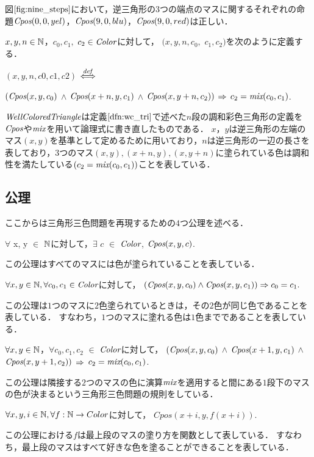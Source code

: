 \begin{exm}
  図$\ref{fig:nine_steps}$において，逆三角形の$3$つの端点のマスに関するそれぞれの命題$\textit{Cpos}(0,0,yel)$，$\textit{Cpos}(9,0,blu)$，$\textit{Cpos}(9,0,red)$は正しい．
\end{exm}
\begin{dfn}[$\WCT$]
  $x, y, n \in \mathbb{N}$，$c_0, c_1,$ $c_2 \in \textit{Color}$に対して，
  \WCT$(x, y, n, c_0,$ $c_1, c_2)$を次のように定義する．
  
  \WCT$(x, y, n, c0, c1, c2)$ $\overset{{\it def}}{\Longleftrightarrow}$
  
  $(\textit{Cpos}(x,y,c_0)$ $\land$ $\textit{Cpos}(x+n,y,c_1)$ $\land$ $\textit{Cpos}(x,y+n,c_2))$ $\Rightarrow$ $c_2 = \textit{mix}(c_0,c_1)$.
  
  $\WCT$は定義$\ref{dfn:wc_tri}$で述べた$n$段の調和彩色三角形の定義を$\textit{Cpos}$や$\textit{mix}$を用いて論理式に書き直したものである．
  $x$，$y$は逆三角形の左端のマス$(x,y)$を基準として定めるために用いており，$n$は逆三角形の一辺の長さを表しており，$3$つのマス$(x,y), (x+n,y), (x,y+n)$に塗られている色は調和性を満たしている$(c_2=\textit{mix}(c_0,c_1))$ことを表している．
\end{dfn}

\subsection{公理}
ここからは三角形三色問題を再現するための$4$つ公理を述べる．
\begin{axm}[$\Cexists$] \label{axm:exists}
  $\forall$ x, y $\in$ $\mathbb{N}$に対して，$\exists$ $c$ $\in$ $\textit{Color}$, $\textit{Cpos}(x,y,c)$.
  
  この公理はすべてのマスには色が塗られていることを表している．
\end{axm}
\begin{axm}[$\Cuniq$] \label{axm:uniq}
  $\forall x, y \in \mathbb{N}, \forall c_0, c_1 \in \textit{Color}$に対して，
  $(\textit{Cpos}(x,y,c_0) \land \textit{Cpos}(x,y,c_1)) \Rightarrow c_0 = c_1.$
  
  この公理は$1$つのマスに$2$色塗られているときは，その$2$色が同じ色であることを表している．
  すなわち，$1$つのマスに塗れる色は$1$色までであることを表している．
\end{axm}
\begin{axm}[$\Cmix$] \label{axm:mix}
  $\forall x, y \in \mathbb{N}$，$\forall c_0, c_1, c_2$ $\in$ $\textit{Color}$に対して，
  $(\textit{Cpos}(x,y,c_0)$ $\land$ $\textit{Cpos}(x+1,y,c_1)$ $\land$ $\textit{Cpos}(x,y+1,c_2))$ $\Rightarrow$ $c_2 = \textit{mix}(c_0,c_1)$.
  
  この公理は隣接する$2$つのマスの色に演算$\textit{mix}$を適用すると間にある$1$段下のマスの色が決まるという三角形三色問題の規則をしている．
\end{axm}
\begin{axm}[$C\_paint$] \label{axm:paint}
  $\forall x, y, i \in \mathbb{N}, \forall f:\mathbb{N} \to Color$に対して，
  $Cpos(x+i,y,f(x+i))$.
  
  この公理における$f$は最上段のマスの塗り方を関数として表している．
  すなわち，最上段のマスはすべて好きな色を塗ることができることを表している．
\end{axm}

